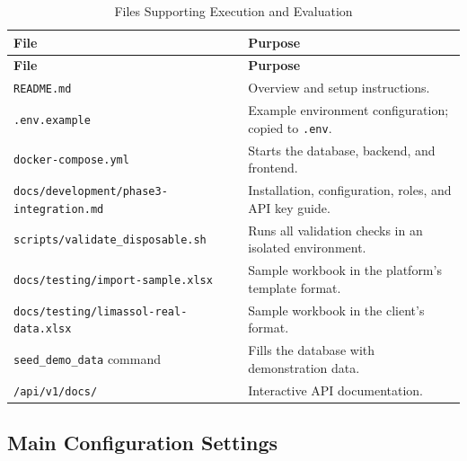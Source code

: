 \documentclass[11pt,a4paper]{article}
\begin{document}
\begin{longtable}{P{5.6cm} P{9.5cm}}
\caption{Files Supporting Execution and Evaluation}
\label{tab:phase3_eval_files}\\

\toprule
\textbf{File} & \textbf{Purpose} \\
\midrule
\endfirsthead

\toprule
\textbf{File} & \textbf{Purpose} \\
\midrule
\endhead

\bottomrule
\endfoot

\texttt{README.md} &
Overview and setup instructions. \\

\texttt{.env.example} &
Example environment configuration; copied to \texttt{.env}. \\

\texttt{docker-compose.yml} &
Starts the database, backend, and frontend. \\

\texttt{docs/development/phase3-integration.md} &
Installation, configuration, roles, and API key guide. \\

\texttt{scripts/validate\_disposable.sh} &
Runs all validation checks in an isolated environment. \\

\texttt{docs/testing/import-sample.xlsx} &
Sample workbook in the platform's template format. \\

\texttt{docs/testing/limassol-real-data.xlsx} &
Sample workbook in the client's format. \\

\texttt{seed\_demo\_data} command &
Fills the database with demonstration data. \\

\texttt{/api/v1/docs/} &
Interactive API documentation. \\

\end{longtable}

\subsection{Main Configuration Settings}
\end{document}
